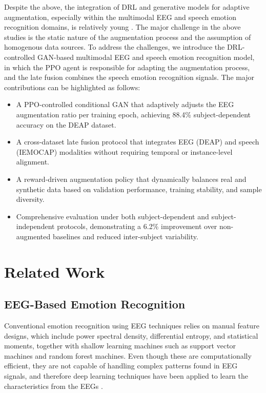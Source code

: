 \documentclass[conference]{IEEEtran}
\begin{document}
Despite the above, the integration of DRL and generative models for adaptive augmentation, especially within the multimodal EEG and speech emotion recognition domains, is relatively young \cite{busso2008iemocap,latif2020vae}. The major challenge in the above studies is the static nature of the augmentation process and the assumption of homogenous data sources. To address the challenges, we introduce the DRL-controlled GAN-based multimodal EEG and speech emotion recognition model, in which the PPO agent is responsible for adapting the augmentation process, and the late fusion combines the speech emotion recognition signals. The major contributions can be highlighted as follows:
\begin{itemize}
\item A PPO-controlled conditional GAN that adaptively adjusts the EEG augmentation ratio per training epoch, achieving 88.4\% subject-dependent accuracy on the DEAP dataset.
\item A cross-dataset late fusion protocol that integrates EEG (DEAP) and speech (IEMOCAP) modalities without requiring temporal or instance-level alignment.
\item A reward-driven augmentation policy that dynamically balances real and synthetic data based on validation performance, training stability, and sample diversity.
\item Comprehensive evaluation under both subject-dependent and subject-independent protocols, demonstrating a 6.2\% improvement over non-augmented baselines and reduced inter-subject variability.
\end{itemize}

\section{Related Work}

\subsection{EEG-Based Emotion Recognition}
Conventional emotion recognition using EEG techniques relies on manual feature designs, which include power spectral density, differential entropy, and statistical moments, together with shallow learning machines such as support vector machines and random forest machines. Even though these are computationally efficient, they are not capable of handling complex patterns found in EEG signals, and therefore deep learning techniques have been applied to learn the characteristics from the EEGs \cite{chen2024gcn}.
\end{document}
